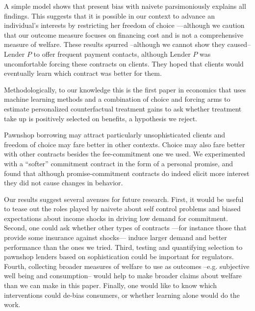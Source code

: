 \documentclass[oneside,11pt]{article}
\begin{document}
A simple model shows that present bias with naivete parsimoniously explains all findings. This suggests that it is possible in our context to advance an individual's interests by restricting her freedom of choice ---although we caution that our outcome measure focuses on financing cost and is not a comprehensive measure of welfare. These results spurred --although we cannot show they caused-- Lender $P$ to offer frequent payment contacts, although Lender $P$ was uncomfortable forcing these contracts on clients. They hoped that clients would eventually learn which contract was better for them.

Methodologically, to our knowledge this is the first paper in economics that uses machine learning methods and a combination of choice and forcing arms to estimate personalized counterfactual treatment gains to ask whether treatment take up is positively selected on benefits, a hypothesis we reject.

Pawnshop borrowing may attract particularly unsophisticated clients and freedom of choice may fare better in other contexts. Choice may also fare better with other contracts besides the fee-commitment one we used. We experimented with a ``softer'' commitment contract in the form of a personal promise, and found that although promise-commitment contracts do indeed elicit more interest they did not cause changes in behavior. 

Our results suggest several avenues for future research. First, it would be useful to tease out the roles played by naivete about self control problems and biased expectations about income shocks in driving low demand for commitment. Second, one could ask whether other types of contracts ---for instance those that provide some insurance against shocks---  induce larger demand and better performance than the ones we tried. Third, testing and quantifying selection to pawnshop lenders based on sophistication could be important for regulators. Fourth, collecting broader measures of welfare to use as outcomes --e.g. subjective well being and consumption-- would help to make broader claims about welfare than we can make in this paper. Finally, one would like to know which interventions could de-bias consumers, or whether learning alone would do the work.







\newpage
\end{document}
